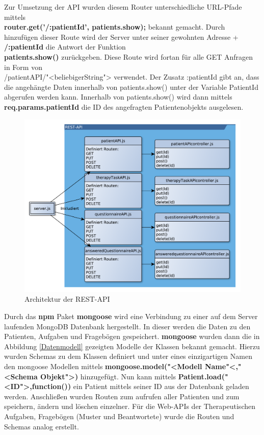 Zur Umsetzung der API wurden diesem Router unterschiedliche URL-Pfade mittels \\ \textbf{router.get('/:patientId', patients.show);} bekannt gemacht. Durch hinzufügen dieser Route wird der Server unter seiner gewohnten Adresse + \textbf{/:patientId} die Antwort der Funktion \\ \textbf{patients.show()} zurückgeben. Diese Route wird fortan für alle GET Anfragen in Form von \\ /patientAPI/"<beliebigerString"> verwendet. Der Zusatz :patientId gibt an, dass die angehängte Daten innerhalb von patients.show() unter der Variable PatientId abgerufen werden kann. Innerhalb von patients.show() wird dann mittels \textbf{req.params.patientId} die ID des angefragten Patientenobjekts ausgelesen.
 \begin{figure}[H]
 	\centering
 	\includegraphics[scale=0.64]{images/RESTAPI_Architektur}
 	\caption[Architektur der REST-API]{Architektur der REST-API}
 	\label{REST Architektur}
 \end{figure}
Durch das \textbf{npm} Paket \textbf{mongoose} wird eine Verbindung zu einer auf dem Server laufenden MongoDB Datenbank hergestellt. In dieser werden die Daten zu den Patienten, Aufgaben und Fragebögen gespeichert. \textbf{mongoose} wurden dann die in Abbildung \ref{Datenmodell} gezeigten Modelle der Klassen bekannt gemacht. Hierzu wurden Schemas zu dem Klassen definiert und unter eines einzigartigen Namen den mongoose Modellen mittels \textbf{mongoose.model("<Modell Name"<,"<Schema Objekt">)} hinzugefügt. Nun kann mittels \textbf{Patient.load("<ID">,function())} ein Patient mittels seiner ID aus der Datenbank geladen werden. Anschließen wurden Routen zum aufrufen aller Patienten und zum speichern, ändern und löschen einzelner. Für die Web-APIs der Therapeutischen Aufgaben, Fragebögen (Muster und Beantwortete) wurde die Routen und Schemas analog erstellt.

